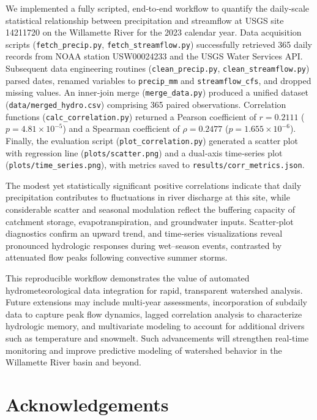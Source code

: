\documentclass[preprint,12pt]{elsarticle}
\begin{document}
We implemented a fully scripted, end‐to‐end workflow to quantify the daily‐scale statistical relationship between precipitation and streamflow at USGS site 14211720 on the Willamette River for the 2023 calendar year. Data acquisition scripts (\texttt{fetch\_precip.py}, \texttt{fetch\_streamflow.py}) successfully retrieved 365 daily records from NOAA station USW00024233 and the USGS Water Services API. Subsequent data engineering routines (\texttt{clean\_precip.py}, \texttt{clean\_streamflow.py}) parsed dates, renamed variables to \texttt{precip\_mm} and \texttt{streamflow\_cfs}, and dropped missing values. An inner‐join merge (\texttt{merge\_data.py}) produced a unified dataset (\texttt{data/merged\_hydro.csv}) comprising 365 paired observations. Correlation functions (\texttt{calc\_correlation.py}) returned a Pearson coefficient of $r = 0.2111$ ($p = 4.81\times10^{-5}$) and a Spearman coefficient of $\rho = 0.2477$ ($p = 1.655\times10^{-6}$). Finally, the evaluation script (\texttt{plot\_correlation.py}) generated a scatter plot with regression line (\texttt{plots/scatter.png}) and a dual‐axis time‐series plot (\texttt{plots/time\_series.png}), with metrics saved to \texttt{results/corr\_metrics.json}.

The modest yet statistically significant positive correlations indicate that daily precipitation contributes to fluctuations in river discharge at this site, while considerable scatter and seasonal modulation reflect the buffering capacity of catchment storage, evapotranspiration, and groundwater inputs. Scatter‐plot diagnostics confirm an upward trend, and time‐series visualizations reveal pronounced hydrologic responses during wet–season events, contrasted by attenuated flow peaks following convective summer storms.

This reproducible workflow demonstrates the value of automated hydrometeorological data integration for rapid, transparent watershed analysis. Future extensions may include multi‐year assessments, incorporation of subdaily data to capture peak flow dynamics, lagged correlation analysis to characterize hydrologic memory, and multivariate modeling to account for additional drivers such as temperature and snowmelt. Such advancements will strengthen real‐time monitoring and improve predictive modeling of watershed behavior in the Willamette River basin and beyond.

\section*{Acknowledgements}
\end{document}
